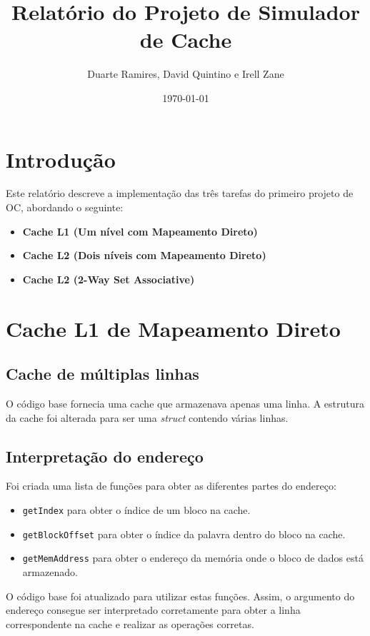 \documentclass{article}
\title{Relatório do Projeto de Simulador de Cache}
\author{Duarte Ramires, David Quintino e Irell Zane}
\date{\today}
\begin{document}
\maketitle

\section{Introdução}
Este relatório descreve a implementação das três tarefas do primeiro projeto de OC, abordando o seguinte:

\begin{itemize}
    \item \textbf{Cache L1 (Um nível com Mapeamento Direto)}
    \item \textbf{Cache L2 (Dois níveis com Mapeamento Direto)}
    \item \textbf{Cache L2 (2-Way Set Associative)}
\end{itemize}

\section{Cache L1 de Mapeamento Direto}
\subsection{Cache de múltiplas linhas}
O código base fornecia uma cache que armazenava apenas uma linha. A estrutura da cache foi alterada para ser uma \textit{struct} contendo várias linhas. 

\subsection{Interpretação do endereço}
Foi criada uma lista de funções para obter as diferentes partes do endereço:
\begin{itemize}
    \item \texttt{getIndex} para obter o índice de um bloco na cache.
    \item \texttt{getBlockOffset} para obter o índice da palavra dentro do bloco na cache.
    \item \texttt{getMemAddress} para obter o endereço da memória onde o bloco de dados está armazenado.
\end{itemize}

O código base foi atualizado para utilizar estas funções. Assim, o argumento do endereço consegue ser interpretado corretamente para obter a linha correspondente na cache e realizar as operações corretas.
\end{document}
